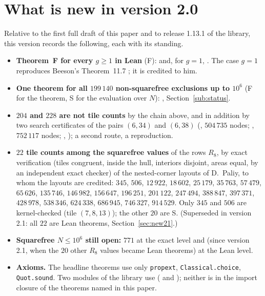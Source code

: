 \documentclass[11pt,reqno]{amsart}
\theoremstyle{plain}
\theoremstyle{definition}
\newcommand{\sF}{\textup{\textsf{F}}}
\newcommand{\sS}{\textup{\textsf{S}}}
\begin{document}
\section{What is new in version 2.0}\label{sec:new}
Relative to the first full draft of this paper and to release 1.13.1 of the library, this version records the following, each with its standing.
\begin{itemize}
\item \textbf{Theorem~F for every $g\ge1$ in Lean} (\sF):  and, for $g=1$, . The case $g=1$ reproduces Beeson's Theorem~11.7 \cite{BeesonIso}; it is credited to him.
\item \textbf{One theorem for all $199\,140$ non-squarefree exclusions up to $10^6$} (\sF{} for the theorem, \sS{} for the evaluation over $N$): , Section~\ref{sub:status}.
\item \textbf{$204$ and $228$ are not tile counts} by the chain above, and in addition by two search certificates of the pairs $(6,34)$ and $(6,38)$ (, $504\,735$ nodes; , $752\,117$ nodes; , ); a second route, a reproduction.
\item \textbf{$22$ tile counts among the squarefree values} of the rows $R_8$, by exact verification (tiles congruent, inside the hull, interiors disjoint, areas equal, by an independent exact checker) of the nested-corner layouts of D.~Paliy, to whom the layouts are credited: $345$, $506$, $12\,922$, $18\,602$, $25\,179$, $35\,763$, $57\,479$, $65\,626$, $135\,746$, $146\,982$, $156\,647$, $196\,251$, $201\,122$, $247\,494$, $388\,847$, $397\,371$, $428\,978$, $538\,346$, $624\,338$, $686\,945$, $746\,327$, $914\,529$. Only $345$ and $506$ are kernel-checked (tile $(7,8,13)$); the other $20$ are \sS. (Superseded in version 2.1: all $22$ are Lean theorems, Section~\ref{sec:new21}.)
\item \textbf{Squarefree $N\le10^6$ still open:} $771$ at the exact level and (since version 2.1, when the $20$ other $R_8$ values became Lean theorems) at the Lean level.
\item \textbf{Axioms.} The headline theorems use only \texttt{propext}, \texttt{Classical.choice}, \texttt{Quot.sound}. Two modules of the library use  ( and ); neither is in the import closure of the theorems named in this paper.
\end{itemize}
\end{document}
